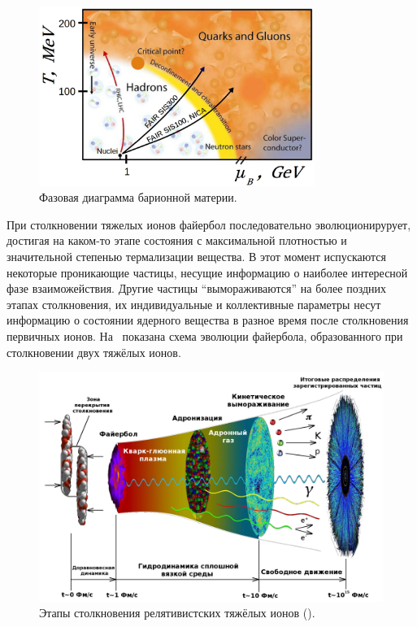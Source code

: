 \begin{figure}[H]
\includegraphics[width=0.8\textwidth]{pictures/QGP_phase_diag_3.png}
\caption{Фазовая диаграмма барионной материи.}
\label{fig:PhaseDiagram}
\end{figure}


При столкновении тяжелых ионов файербол последовательно эволюционирурует, достигая на каком-то этапе состояния с максимальной плотностью и значительной степенью термализации вещества. В этот момент испускаются некоторые проникающие частицы, несущие информацию о наиболее интересной фазе взаиможействия. Другие частицы ``вымораживаются'' на более поздних этапах столкновения, их индивидуальные и коллективные параметры несут информацию о состоянии ядерного вещества в разное время после столкновения первичных ионов. На~ показана схема эволюции файербола, образованного при столкновении двух тяжёлых ионов.

\begin{figure}[H]
\includegraphics[width=1.0\textwidth]{pictures/little_bang_rus2.png}
\caption{Этапы столкновения релятивистских тяжёлых ионов (\cite{Chen}).}
\label{fig:LittleBang}
\end{figure}

